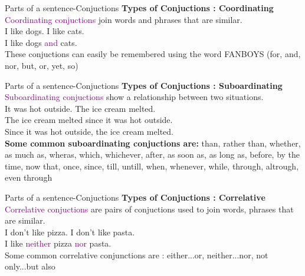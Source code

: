 \documentclass{beamer}
\begin{document}
\begin{frame}{Parts of a sentence-Conjuctions}
\centering
\textbf{Types of Conjuctions : Coordinating}\\
\vspace{0.2in}
\textcolor{purple}{Coordinating conjuctions} join words and phrases that are similar.\\
\vspace{0.2in}
I like dogs. I like cats.\\
\vspace{0.2in}
I like dogs \textcolor{purple}{and} cats.\\
\vspace{0.2in}
These conjuctions can easily be remembered using the word FANBOYS (for, and, nor, but, or, yet, so)\\    
\end{frame}

\begin{frame}{Parts of a sentence-Conjuctions}
\centering
\textbf{Types of Conjuctions : Suboardinating}\\
\vspace{0.2in}
\textcolor{purple}{Suboardinating conjuctions} show a relationship between two situations.\\
\vspace{0.2in}
It was hot outside. The ice cream melted.\\
\vspace{0.2in}
The ice cream melted since it was hot outside.\\
\vspace{0.2in}
Since it was hot outside, the ice cream melted.\\
\vspace{0.2in}
\textbf{Some common suboardinating conjuctions are:} than, rather than, whether, as much as, wheras, which, whichever, after, as soon as, as long as, before, by the time, now that, once, since, till, untill, when, whenever, while, through, altrough, even through\\
\end{frame}

 \begin{frame}{Parts of a sentence-Conjuctions}
 \centering
 \textbf{Types of Conjuctions : Correlative}\\
 \vspace{0.2in}
 \textcolor{purple}{Correlative conjuctions} are pairs of conjuctions used to join words, phrases that are similar.\\
 \vspace{0.2in}
 I don't like pizza. I don't like pasta.\\
 \vspace{0.2in}
 I like \textcolor{purple}{neither} pizza \textcolor{purple}{nor} pasta.\\
 \vspace{0.2in}
 Some common correlative conjunctions are : either...or, neither...nor, not only...but also     
 \end{frame}
 
\end{document}
